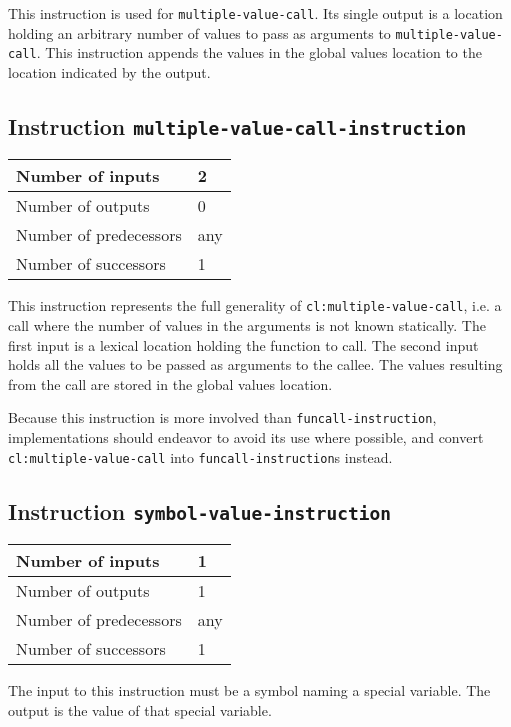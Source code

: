 This instruction is used for \texttt{multiple-value-call}.  Its single
output is a location holding an arbitrary number of values to pass as
arguments to \texttt{multiple-value-call}.  This instruction
appends the values in the global values location to the location
indicated by the output.

\subsection{Instruction \texttt{multiple-value-call-instruction}}
\label{hir-instruction-multiple-value-call}

\begin{tabular}{|l|l|}
  \hline
  Number of inputs & 2\\
  \hline
  Number of outputs & 0\\
  \hline
  Number of predecessors & any\\
  \hline
  Number of successors & 1\\
  \hline
\end{tabular}

This instruction represents the full generality of
\texttt{cl:multiple-value-call}, i.e. a call where the number of
values in the arguments is not known statically. The first input is a
lexical location holding the function to call.  The second input holds
all the values to be passed as arguments to the callee.  The values
resulting from the call are stored in the global values location.

Because this instruction is more involved than
\texttt{funcall-instruction}, implementations should endeavor to
avoid its use where possible, and convert
\texttt{cl:multiple-value-call} into \texttt{funcall-instruction}s
instead.

\subsection{Instruction \texttt{symbol-value-instruction}}
\label{hir-instruction-symbol-value}

\begin{tabular}{|l|l|}
\hline
Number of inputs & 1\\
\hline
Number of outputs & 1\\
\hline
Number of predecessors & any\\
\hline
Number of successors & 1\\
\hline
\end{tabular}

The input to this instruction must be a symbol naming a special
variable.  The output is the value of that special variable.

